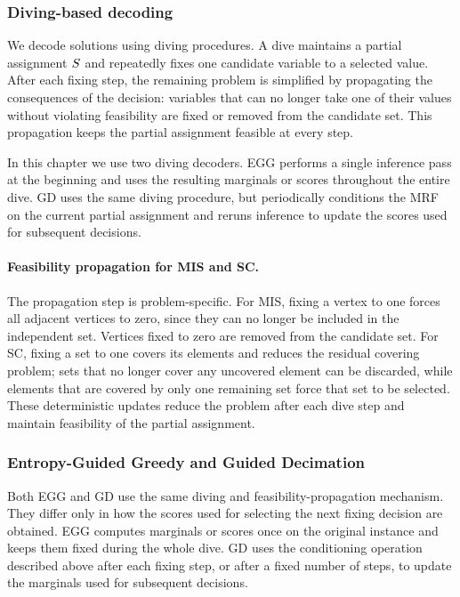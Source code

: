 \subsubsection{Diving-based decoding}

We decode solutions using diving procedures. A dive maintains a partial assignment $S$ and repeatedly fixes one candidate variable to a selected value. After each fixing step, the remaining problem is simplified by propagating the consequences of the decision: variables that can no longer take one of their values without violating feasibility are fixed or removed from the candidate set. This propagation keeps the partial assignment feasible at every step.

In this chapter we use two diving decoders. EGG performs a single inference pass at the beginning and uses the resulting marginals or scores throughout the entire dive. GD uses the same diving procedure, but periodically conditions the MRF on the current partial assignment and reruns inference to update the scores used for subsequent decisions.

\paragraph{Feasibility propagation for MIS and SC.} The propagation step is problem-specific. For MIS, fixing a vertex to one forces all adjacent vertices to zero, since they can no longer be included in the independent set. Vertices fixed to zero are removed from the candidate set. For SC, fixing a set to one covers its elements and reduces the residual covering problem; sets that no longer cover any uncovered element can be discarded, while elements that are covered by only one remaining set force that set to be selected. These deterministic updates reduce the problem after each dive step and maintain feasibility of the partial assignment.



\subsubsection{Entropy-Guided Greedy and Guided Decimation}

Both EGG and GD use the same diving and feasibility-propagation mechanism. They differ only in how the scores used for selecting the next fixing decision are obtained. EGG computes marginals or scores once on the original instance and keeps them fixed during the whole dive. GD uses the conditioning operation described above after each fixing step, or after a fixed number of steps, to update the marginals used for subsequent decisions.

